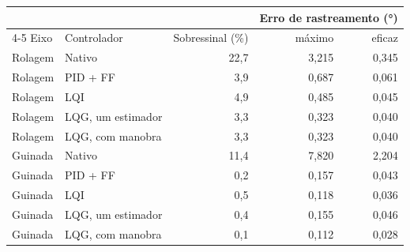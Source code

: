 \begin{tabular}{llrrr}
\toprule
 & & & \multicolumn{2}{c}{Erro de rastreamento (\si{\degree})} \\
\cmidrule(lr){4-5}
Eixo & Controlador & Sobressinal (\%) & máximo & eficaz \\
\midrule
Rolagem & Nativo & 22,7 & 3,215 & 0,345 \\
Rolagem & PID + FF & 3,9 & 0,687 & 0,061 \\
Rolagem & LQI & 4,9 & 0,485 & 0,045 \\
Rolagem & LQG, um estimador & 3,3 & 0,323 & 0,040 \\
Rolagem & LQG, com manobra & 3,3 & 0,323 & 0,040 \\
\addlinespace
Guinada & Nativo & 11,4 & 7,820 & 2,204 \\
Guinada & PID + FF & 0,2 & 0,157 & 0,043 \\
Guinada & LQI & 0,5 & 0,118 & 0,036 \\
Guinada & LQG, um estimador & 0,4 & 0,155 & 0,046 \\
Guinada & LQG, com manobra & 0,1 & 0,112 & 0,028 \\
\bottomrule
\end{tabular}

